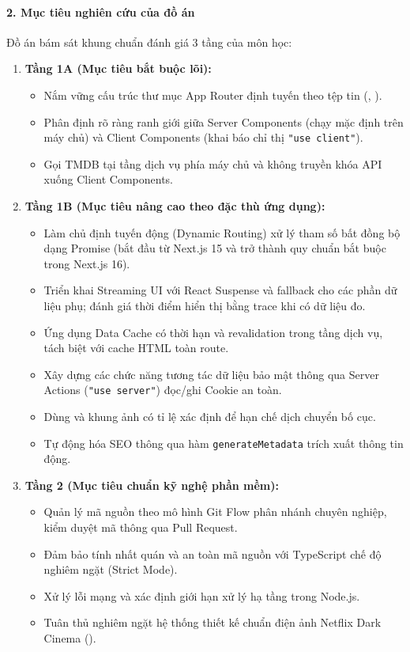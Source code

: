 \documentclass[12pt,a4paper]{extarticle}
\begin{document}
\paragraph*{2. Mục tiêu nghiên cứu của đồ án}
Đồ án bám sát khung chuẩn đánh giá 3 tầng của môn học:
\begin{enumerate}[noitemsep]
    \item \textbf{Tầng 1A (Mục tiêu bắt buộc lõi):}
    \begin{itemize}[noitemsep]
        \item Nắm vững cấu trúc thư mục App Router định tuyến theo tệp tin (, ).
        \item Phân định rõ ràng ranh giới giữa Server Components (chạy mặc định trên máy chủ) và Client Components (khai báo chỉ thị \texttt{"use client"}).
        \item Gọi TMDB tại tầng dịch vụ phía máy chủ và không truyền khóa API xuống Client Components.
    \end{itemize}
    \item \textbf{Tầng 1B (Mục tiêu nâng cao theo đặc thù ứng dụng):}
    \begin{itemize}[noitemsep]
        \item Làm chủ định tuyến động (Dynamic Routing)  xử lý tham số bất đồng bộ dạng Promise (bắt đầu từ Next.js 15 và trở thành quy chuẩn bắt buộc trong Next.js 16).
        \item Triển khai Streaming UI với React Suspense và fallback cho các phần dữ liệu phụ; đánh giá thời điểm hiển thị bằng trace khi có dữ liệu đo.
        \item Ứng dụng Data Cache có thời hạn và revalidation trong tầng dịch vụ, tách biệt với cache HTML toàn route.
        \item Xây dựng các chức năng tương tác dữ liệu bảo mật thông qua Server Actions (\texttt{"use server"}) đọc/ghi Cookie an toàn.
        \item Dùng  và khung ảnh có tỉ lệ xác định để hạn chế dịch chuyển bố cục.
        \item Tự động hóa SEO thông qua hàm \texttt{generateMetadata} trích xuất thông tin động.
    \end{itemize}
    \item \textbf{Tầng 2 (Mục tiêu chuẩn kỹ nghệ phần mềm):}
    \begin{itemize}[noitemsep]
        \item Quản lý mã nguồn theo mô hình Git Flow phân nhánh chuyên nghiệp, kiểm duyệt mã thông qua Pull Request.
        \item Đảm bảo tính nhất quán và an toàn mã nguồn với TypeScript chế độ nghiêm ngặt (Strict Mode).
        \item Xử lý lỗi mạng và xác định giới hạn xử lý hạ tầng trong Node.js.
        \item Tuân thủ nghiêm ngặt hệ thống thiết kế chuẩn điện ảnh Netflix Dark Cinema ().
    \end{itemize}
\end{enumerate}
\end{document}
